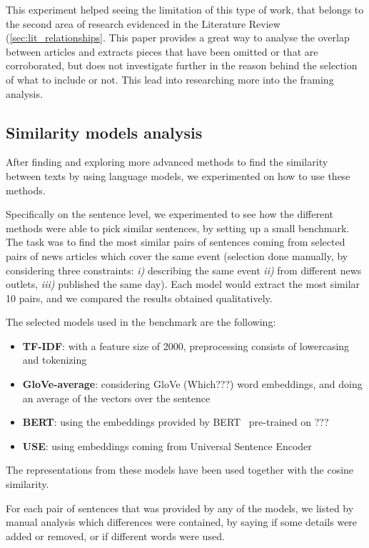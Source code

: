 This experiment helped seeing the limitation of this type of work, that belongs to the second area of research evidenced in the Literature Review (\ref{sec:lit_relationships}. This paper provides a great way to analyse the overlap between articles and extracts pieces that have been omitted or that are corroborated, but does not investigate further in the reason behind the selection of what to include or not. This lead into researching more into the framing analysis. 



\subsection{Similarity models analysis}
After finding and exploring more advanced methods to find the similarity between texts by using language models, we experimented on how to use these methods.

Specifically on the sentence level, we experimented to see how the different methods were able to pick similar sentences, by setting up a small benchmark. The task was to find the most similar pairs of sentences coming from selected pairs of news articles which cover the same event (selection done manually, by considering three constraints: \textit{i)} describing the same event \textit{ii)} from different news outlets, \textit{iii)} published the same day).
Each model would extract the most similar 10 pairs, and we compared the results obtained qualitatively.

The selected models used in the benchmark are the following:
\begin{itemize}
    \item \textbf{TF-IDF}: with a feature size of 2000, preprocessing consists of lowercasing and tokenizing
    \item \textbf{GloVe-average}: considering GloVe (Which???) word embeddings, and doing an average of the vectors over the sentence
    \item \textbf{BERT}: using the embeddings provided by BERT~\cite{devlin2018bert} pre-trained on ???
    \item \textbf{USE}: using embeddings coming from Universal Sentence Encoder~\cite{cer2018universal}
\end{itemize}
The representations from these models have been used together with the cosine similarity.

For each pair of sentences that was provided by any of the models, we listed by manual analysis which differences were contained, by saying if some details were added or removed, or if different words were used.


